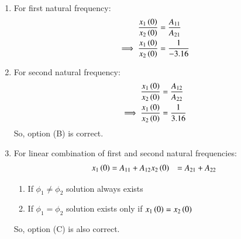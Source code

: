 \documentclass[journal,12pt,twocolumn]{IEEEtran}
\theoremstyle{remark}
\begin{document}
\begin{enumerate}
    \item For first natural frequency: 
    \begin{align}
    \frac{x_1\left(0\right)}{x_2\left(0\right)}&=\frac{A_{11}}{A_{21}}\\
    \implies \frac{x_1\left(0\right)}{x_2\left(0\right)} &= \frac{1}{-3.16}
    \end{align}
    \item For second natural frequency: 
    \begin{align}
    \frac{x_1\left(0\right)}{x_2\left(0\right)}&=\frac{A_{12}}{A_{22}}\\
    \implies \frac{x_1\left(0\right)}{x_2\left(0\right)} &= \frac{1}{3.16}
    \end{align}
    So, option (B) is correct.
    \item For linear combination of first and second natural frequencies:
    \begin{align}
        x_1\left(0\right) &= A_{11}+ A_{12}
        x_2\left(0\right) &= A_{21}+ A_{22}
    \end{align}
    \begin{enumerate}
        \item If $ \phi_1 \neq \phi_2$ solution always exists
        \item If $ \phi_1 = \phi_2$ solution exists only if $ x_1\left(0\right)=x_2\left(0\right)$
    \end{enumerate}
    So, option (C) is also correct.
\end{enumerate}
\end{document}

